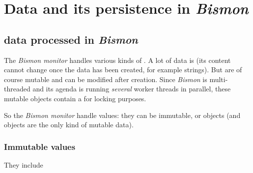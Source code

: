 \section{Data and its persistence in \emph{Bismon}}

\subsection{data processed in \emph{Bismon}}

The \emph{Bismon monitor} handles various kinds of
. A lot of data is  (its
content cannot change once the data has been created, for example
strings). But  are of course mutable
and can be modified after creation. Since \emph{Bismon} is
multi-threaded and its agenda is running \emph{several} worker threads
in parallel, these mutable objects contain a  for
locking purposes.

So the \emph{Bismon monitor} handle values: they can be immutable, or
objects (and objects are the only kind of mutable data).

\subsubsection{Immutable values}

They include

